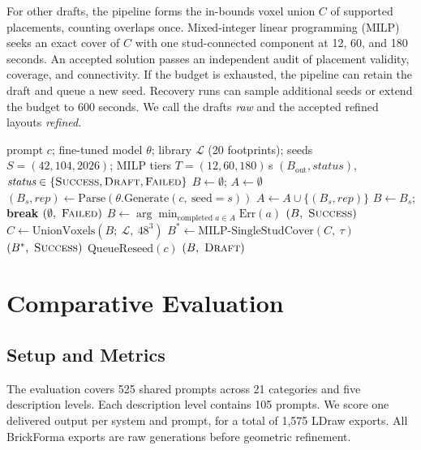 \documentclass[letterpaper]{article} %
\begin{document}
For other drafts, the pipeline forms the in-bounds voxel union $C$ of supported placements, counting overlaps once. Mixed-integer linear programming (MILP) seeks an exact cover of $C$ with one stud-connected component at 12, 60, and 180 seconds. An accepted solution passes an independent audit of placement validity, coverage, and connectivity. If the budget is exhausted, the pipeline can retain the draft and queue a new seed. Recovery runs can sample additional seeds or extend the budget to 600 seconds. We call the drafts \emph{raw} and the accepted refined layouts \emph{refined}.
\begin{algorithm}[tb]
\caption{BrickForma inference and refinement}
\label{alg:inference-refinement}
\small
\begin{algorithmic}[1]
\REQUIRE prompt $c$; fine-tuned model $\theta$; library $\mathcal{L}$ (20 footprints); seeds $S=(42,104,2026)$; MILP tiers $T=(12,60,180)$\,s
\ENSURE $(B_{\mathrm{out}}, \textit{status})$, $\textit{status}\in\{\textsc{Success},\textsc{Draft},\textsc{Failed}\}$
\STATE $B \gets \emptyset$; $A \gets \emptyset$
  \STATE $(B_s,\textit{rep}) \gets \mathrm{Parse}(\theta.\mathrm{Generate}(c,\ \mathrm{seed}{=}s))$
  \STATE $A \gets A \cup \{(B_s,\textit{rep})\}$
    \STATE $B \gets B_s$; \textbf{break}
  \ENDIF
\ENDFOR
{}
    \RETURN $(\emptyset,\ \textsc{Failed})$
  \ENDIF
  \STATE $B \gets \arg\min_{\text{completed } a\in A} \mathrm{Err}(a)$
\ENDIF
{}
  \RETURN $(B,\ \textsc{Success})$ 
\ENDIF
\STATE $C \gets \mathrm{UnionVoxels}(B;\ \mathcal{L},\ 48^3)$ 
  \STATE $B^{*} \gets \mathrm{MILP\text{-}SingleStudCover}(C,\ \tau)$
    \RETURN $(B^{*},\ \textsc{Success})$
  \ENDIF
\ENDFOR
\STATE $\mathrm{QueueReseed}(c)$
\RETURN $(B,\ \textsc{Draft})$ 
\end{algorithmic}
\end{algorithm}
\section{Comparative Evaluation}
\label{sec:eval}
\subsection{Setup and Metrics}
\label{sec:setup}
The evaluation covers 525 shared prompts across 21 categories and five description levels. Each description level contains 105 prompts. We score one delivered output per system and prompt, for a total of 1,575 LDraw exports. All BrickForma exports are raw generations before geometric refinement.
\end{document}
